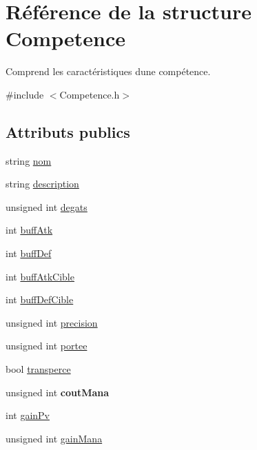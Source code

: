 \hypertarget{structCompetence}{}\section{Référence de la structure Competence}
\label{structCompetence}


Comprend les caractéristiques d\textquotesingle{}une compétence.  




{\ttfamily \#include $<$Competence.\+h$>$}

\subsection*{Attributs publics}
\begin{DoxyCompactItemize}
\item 
string \mbox{\hyperlink{structCompetence_ae63b4d33134d0eb356453ee6fcfcf3c5}{nom}}
\item 
string \mbox{\hyperlink{structCompetence_a532f766c2ba47850ccde304c0d232fae}{description}}
\item 
unsigned int \mbox{\hyperlink{structCompetence_a08f1a4a8857d751f1381f37f9b733263}{degats}}
\item 
int \mbox{\hyperlink{structCompetence_ab73f7a437c97be5e93f0f705c529fd3f}{buff\+Atk}}
\item 
int \mbox{\hyperlink{structCompetence_a5a44f07282d561c3a4205e92529498e2}{buff\+Def}}
\item 
int \mbox{\hyperlink{structCompetence_afac4c1ff400719d46a481136ddbb147e}{buff\+Atk\+Cible}}
\item 
int \mbox{\hyperlink{structCompetence_a05a04fab2d82188e07d7df7c4033895e}{buff\+Def\+Cible}}
\item 
unsigned int \mbox{\hyperlink{structCompetence_a6faa4f743cf162f1f21c1b8593cbca72}{precision}}
\item 
unsigned int \mbox{\hyperlink{structCompetence_a7e9d57599f5eea9c6ba7a47a903b62cc}{portee}}
\item 
bool \mbox{\hyperlink{structCompetence_a9a2c12cc4d9f65e4d9b3276214ba4430}{transperce}}
\item 
\mbox{\label{structCompetence_a4e423ac308f4971f8a28a5c4e4424b05}} 
unsigned int {\bfseries cout\+Mana}
\item 
int \mbox{\hyperlink{structCompetence_a04e2023a681e6862535ed586b3f4f252}{gain\+Pv}}
\item 
unsigned int \mbox{\hyperlink{structCompetence_ae7c7bdb44563e2f93cf462bf4b096080}{gain\+Mana}}
\end{DoxyCompactItemize}


